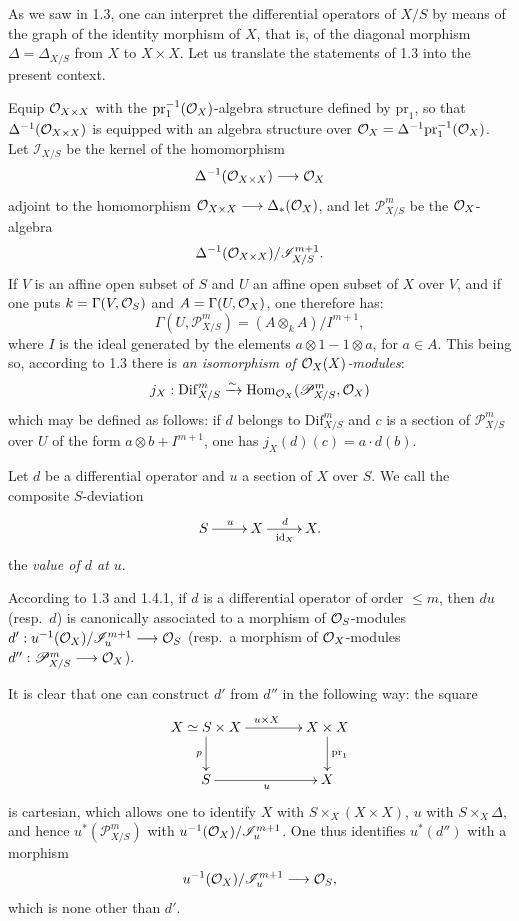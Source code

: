 As we saw in 1.3, one can interpret the differential operators of $X/S$ by means of the graph of the identity morphism of $X$, that is, of the diagonal morphism $\Delta=\Delta_{X/S}$ from $X$ to $X\times X$. Let us translate the statements of 1.3 into the present context.

Equip $\mathcal{O}_{X\times X}$ with the $\mathrm{pr}_1^{-1}(\mathcal{O}_X)$-algebra structure defined by $\mathrm{pr}_1$, so that $\Delta^{-1}(\mathcal{O}_{X\times X})$ is equipped with an algebra structure over $\mathcal{O}_X=\Delta^{-1}\mathrm{pr}_1^{-1}(\mathcal{O}_X)$. Let $\mathscr I_{X/S}$ be the kernel of the homomorphism
\[
\Delta^{-1}(\mathcal{O}_{X\times X})\longrightarrow\mathcal{O}_X
\]
adjoint to the homomorphism $\mathcal{O}_{X\times X}\longrightarrow\Delta_*(\mathcal{O}_X)$, and let $\mathscr P_{X/S}^m$ be the $\mathcal{O}_X$-algebra
\[
\Delta^{-1}(\mathcal{O}_{X\times X})/\mathscr I_{X/S}^{m+1}.
\]
If $V$ is an affine open subset of $S$ and $U$ an affine open subset of $X$ over $V$, and if one puts $k=\Gamma(V,\mathcal{O}_S)$ and $A=\Gamma(U,\mathcal{O}_X)$, one therefore has:
\[
\Gamma(U,\mathscr P_{X/S}^m)=(A\otimes_k A)/I^{m+1},
\]
where $I$ is the ideal generated by the elements $a\otimes1-1\otimes a$, for $a\in A$. This being so, according to 1.3 there is \emph{an isomorphism of $\mathcal{O}_X(X)$-modules}:
\[
j_X:\mathrm{Dif}_{X/S}^m\xrightarrow{\sim}\operatorname{Hom}_{\mathcal{O}_X}(\mathscr P_{X/S}^m,\mathcal{O}_X)
\]
which may be defined as follows: if $d$ belongs to $\mathrm{Dif}_{X/S}^m$ and $c$ is a section of $\mathscr P_{X/S}^m$ over $U$ of the form $a\otimes b+I^{m+1}$, one has $j_X(d)(c)=a\cdot d(b)$.

Let $d$ be a differential operator and $u$ a section of $X$ over $S$. We call the composite $S$-deviation
\[
\xymatrix{S\ar[r]^u&X\ar[r]^d_{\mathrm{id}_X}&X.}
\]
the \emph{value of $d$ at $u$}.

According to 1.3 and 1.4.1, if $d$ is a differential operator of order $\leq m$, then $du$ (resp.\ $d$) is canonically associated to a morphism of $\mathcal{O}_S$-modules $d':u^{-1}(\mathcal{O}_X)/\mathscr I_u^{m+1}\longrightarrow\mathcal{O}_S$ (resp.\ a morphism of $\mathcal{O}_X$-modules $d'':\mathscr P_{X/S}^m\longrightarrow\mathcal{O}_X$).

It is clear that one can construct $d'$ from $d''$ in the following way: the square
\[
\xymatrix@C=4em{X\simeq S\times X\ar[r]^{u\times X}\ar[d]_p&X\times X\ar[d]^{\mathrm{pr}_1}\\
S\ar[r]_u&X}
\]
is cartesian, which allows one to identify $X$ with $S\times_X(X\times X)$, $u$ with $S\times_X\Delta$, and hence $u^*(\mathscr P_{X/S}^m)$ with $u^{-1}(\mathcal{O}_X)/\mathscr I_u^{m+1}$. One thus identifies $u^*(d'')$ with a morphism
\[
u^{-1}(\mathcal{O}_X)/\mathscr I_u^{m+1}\longrightarrow\mathcal{O}_S,
\]
which is none other than $d'$.


